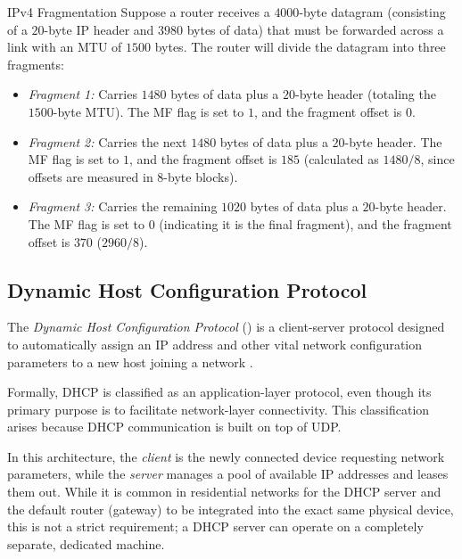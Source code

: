 \begin{example}{IPv4 Fragmentation}
Suppose a router receives a \(4000\)-byte datagram (consisting of a \(20\)-byte IP header and \(3980\) bytes of data) that must be forwarded across a link with an MTU of \(1500\) bytes. The router will divide the datagram into three fragments:
\begin{itemize}
    \item \emph{Fragment 1:} Carries \(1480\) bytes of data plus a \(20\)-byte header (totaling the \(1500\)-byte MTU). The MF flag is set to \(1\), and the fragment offset is \(0\).
    \item \emph{Fragment 2:} Carries the next \(1480\) bytes of data plus a \(20\)-byte header. The MF flag is set to \(1\), and the fragment offset is \(185\) (calculated as \(1480 / 8\), since offsets are measured in \(8\)-byte blocks).
    \item \emph{Fragment 3:} Carries the remaining \(1020\) bytes of data plus a \(20\)-byte header. The MF flag is set to \(0\) (indicating it is the final fragment), and the fragment offset is \(370\) (\(2960 / 8\)).
\end{itemize}
\end{example}

\subsection{Dynamic Host Configuration Protocol}
The \emph{Dynamic Host Configuration Protocol} () is a client-server protocol designed to automatically assign an IP address and other vital network configuration parameters to a new host joining a network \cite{rfc2131}.

Formally, DHCP is classified as an application-layer protocol, even though its primary purpose is to facilitate network-layer connectivity. This classification arises because DHCP communication is built on top of UDP. 

In this architecture, the \emph{client} is the newly connected device requesting network parameters, while the \emph{server} manages a pool of available IP addresses and leases them out. While it is common in residential networks for the DHCP server and the default router (gateway) to be integrated into the exact same physical device, this is not a strict requirement; a DHCP server can operate on a completely separate, dedicated machine.

